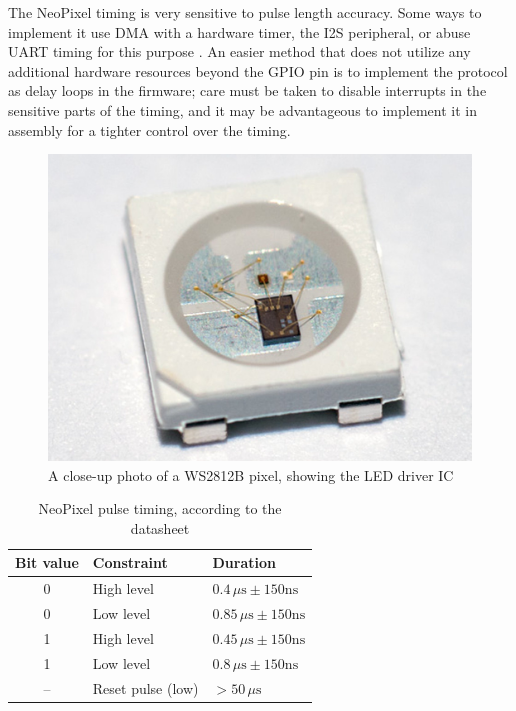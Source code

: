 The NeoPixel timing is very sensitive to pulse length accuracy. Some ways to implement it use \gls{DMA} with a hardware timer, the \gls{I2S} peripheral, or abuse \gls{UART} timing for this purpose \cite{ow-uart}. An easier method that does not utilize any additional hardware resources beyond the \gls{GPIO} pin is to implement the protocol as delay loops in the firmware; care must be taken to disable interrupts in the sensitive parts of the timing, and it may be advantageous to implement it in assembly for a tighter control over the timing.

\begin{figure}[h]
	\centering
	\includegraphics[width=.5\textwidth] {img/ws2812b-detail.jpg}
	\caption{\label{fig:ws2812-detail}A close-up photo of a WS2812B pixel, showing the LED driver IC}
\end{figure}

\begin{table}[h]
	\centering
	\begin{tabular}{cll}
		\toprule
		\textbf{Bit value} & \textbf{Constraint} & \textbf{Duration} \\
		\midrule
		0 & High level & $0.4\,\mu\mathrm{s}\pm150\mathrm{ns}$ \\
		0 & Low level & $0.85\,\mu\mathrm{s}\pm150\mathrm{ns}$ \\
		1 & High level & $0.45\,\mu\mathrm{s}\pm150\mathrm{ns}$ \\
		1 & Low level & $0.8\,\mu\mathrm{s}\pm150\mathrm{ns}$ \\
		-- & Reset pulse (low) & $>50\,\mu\mathrm{s}$ \\
		\bottomrule
	\end{tabular}
	\caption{\label{fig:ws2812-dia}NeoPixel pulse timing, according to the datasheet}
\end{table}




